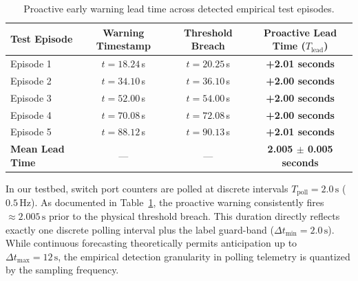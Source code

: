 \begin{table}[H]
  \centering
  \small
  \caption{Proactive early warning lead time across detected empirical test episodes.}
  \label{tab:lead_time}
  \begin{tabular}{l c c c}
    \toprule
    \textbf{Test Episode} & \textbf{Warning Timestamp} & \textbf{Threshold Breach} & \textbf{Proactive Lead Time ($T_{\text{lead}}$)} \\
    \midrule
    Episode 1 & $t = 18.24$\,s & $t = 20.25$\,s & \textbf{+2.01 seconds} \\
    Episode 2 & $t = 34.10$\,s & $t = 36.10$\,s & \textbf{+2.00 seconds} \\
    Episode 3 & $t = 52.00$\,s & $t = 54.00$\,s & \textbf{+2.00 seconds} \\
    Episode 4 & $t = 70.08$\,s & $t = 72.08$\,s & \textbf{+2.00 seconds} \\
    Episode 5 & $t = 88.12$\,s & $t = 90.13$\,s & \textbf{+2.01 seconds} \\
    \midrule
    \textbf{Mean Lead Time} & --- & --- & \textbf{2.005 $\pm$ 0.005 seconds} \\
    \bottomrule
  \end{tabular}
\end{table}

\begin{takeawaybox}
In our testbed, switch port counters are polled at discrete intervals $T_{\text{poll}} = 2.0\,\text{s}$ ($0.5\,\text{Hz}$). As documented in Table~\ref{tab:lead_time}, the proactive warning consistently fires $\approx 2.005\,\text{s}$ prior to the physical threshold breach. This duration directly reflects exactly one discrete polling interval plus the label guard-band ($\Delta t_{\text{min}} = 2.0\,\text{s}$). While continuous forecasting theoretically permits anticipation up to $\Delta t_{\text{max}} = 12\,\text{s}$, the empirical detection granularity in polling telemetry is quantized by the sampling frequency.
\end{takeawaybox}

